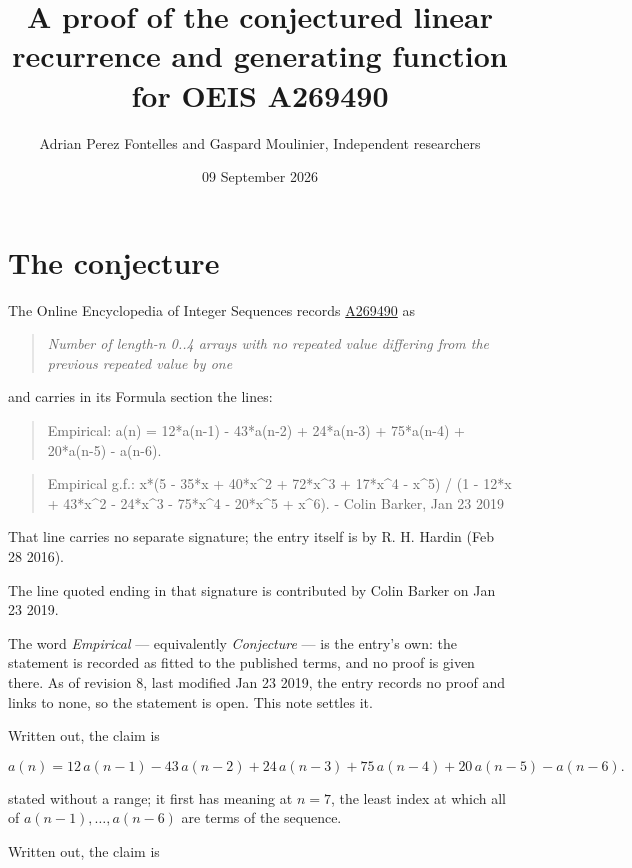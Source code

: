 \documentclass[11pt]{article}
\title{A proof of the conjectured linear recurrence and generating function for OEIS A269490}
\author{Adrian Perez Fontelles and Gaspard Moulinier, Independent researchers}
\date{09 September 2026}
\theoremstyle{definition}
\begin{document}
\maketitle
\section{The conjecture}

The Online Encyclopedia of Integer Sequences records \href{https://oeis.org/A269490}{A269490} as

\begin{quote}\itshape Number of length-n 0..4 arrays with no repeated value differing from the previous repeated value by one\end{quote}

and carries in its Formula section the lines:

\begin{quote}\ttfamily Empirical: a(n) = 12*a(n-1) - 43*a(n-2) + 24*a(n-3) + 75*a(n-4) + 20*a(n-5) - a(n-6).\end{quote}

\begin{quote}\ttfamily Empirical g.f.: x*(5 - 35*x + 40*x\textasciicircum{}2 + 72*x\textasciicircum{}3 + 17*x\textasciicircum{}4 - x\textasciicircum{}5) / (1 - 12*x + 43*x\textasciicircum{}2 - 24*x\textasciicircum{}3 - 75*x\textasciicircum{}4 - 20*x\textasciicircum{}5 + x\textasciicircum{}6). - Colin Barker, Jan 23 2019\end{quote}

That line carries no separate signature; the entry itself is by R. H. Hardin (Feb 28 2016).

The line quoted ending in that signature is contributed by Colin Barker on Jan 23 2019.

The word {\itshape Empirical} --- equivalently {\itshape Conjecture} --- is the entry's own: the statement is recorded as fitted to the published terms, and no proof is given there. As of revision 8, last modified Jan 23 2019, the entry records no proof and links to none, so the statement is open. This note settles it.

Written out, the claim is

\[a(n) = 12\,a(n-1) - 43\,a(n-2) + 24\,a(n-3) + 75\,a(n-4) + 20\,a(n-5) - a(n-6).\]

stated without a range; it first has meaning at $n = 7$, the least index at which all of $a(n-1),\dots,a(n-6)$ are terms of the sequence.

Written out, the claim is
\end{document}
